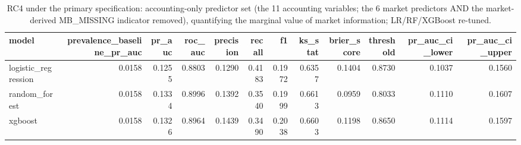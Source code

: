 \begin{table}[htbp]
\centering
\caption{RC4 under the primary specification: accounting-only predictor set (the 11 accounting variables; the 6 market predictors AND the market-derived MB\_MISSING indicator removed), quantifying the marginal value of market information; LR/RF/XGBoost re-tuned.}
\label{tab:v2_rc4}
\small
\begin{tabular}{lrrrrrrrrrrr}
\toprule
model & prevalence\_baseline\_pr\_auc & pr\_auc & roc\_auc & precision & recall & f1 & ks\_stat & brier\_score & threshold & pr\_auc\_ci\_lower & pr\_auc\_ci\_upper \\
\midrule
logistic\_regression & 0.0158 & 0.1255 & 0.8803 & 0.1290 & 0.4183 & 0.1972 & 0.6357 & 0.1404 & 0.8730 & 0.1037 & 0.1560 \\
random\_forest & 0.0158 & 0.1334 & 0.8996 & 0.1392 & 0.3540 & 0.1999 & 0.6613 & 0.0959 & 0.8033 & 0.1110 & 0.1607 \\
xgboost & 0.0158 & 0.1326 & 0.8964 & 0.1439 & 0.3490 & 0.2038 & 0.6603 & 0.1198 & 0.8650 & 0.1114 & 0.1597 \\
\bottomrule
\end{tabular}
\end{table}
